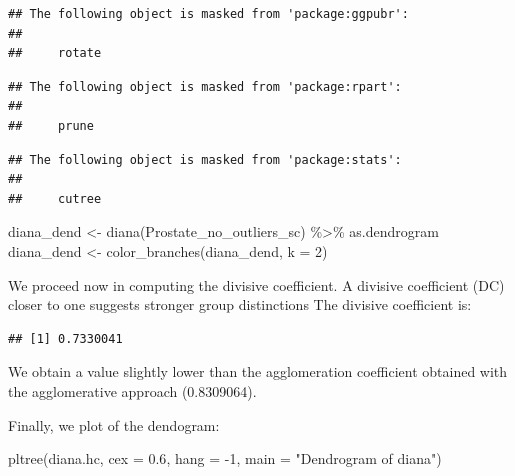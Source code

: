 \documentclass[
]{article}
\newenvironment{Shaded}{\begin{snugshade}}{\end{snugshade}}
\newcommand{\AttributeTok}[1]{\textcolor[rgb]{0.77,0.63,0.00}{#1}}
\newcommand{\DecValTok}[1]{\textcolor[rgb]{0.00,0.00,0.81}{#1}}
\newcommand{\FloatTok}[1]{\textcolor[rgb]{0.00,0.00,0.81}{#1}}
\newcommand{\FunctionTok}[1]{\textcolor[rgb]{0.00,0.00,0.00}{#1}}
\newcommand{\NormalTok}[1]{#1}
\newcommand{\OtherTok}[1]{\textcolor[rgb]{0.56,0.35,0.01}{#1}}
\newcommand{\SpecialCharTok}[1]{\textcolor[rgb]{0.00,0.00,0.00}{#1}}
\newcommand{\StringTok}[1]{\textcolor[rgb]{0.31,0.60,0.02}{#1}}
\begin{document}
\begin{verbatim}
## The following object is masked from 'package:ggpubr':
## 
##     rotate
\end{verbatim}

\begin{verbatim}
## The following object is masked from 'package:rpart':
## 
##     prune
\end{verbatim}

\begin{verbatim}
## The following object is masked from 'package:stats':
## 
##     cutree
\end{verbatim}

\begin{Shaded}
\begin{Highlighting}[]
\NormalTok{diana\_dend }\OtherTok{\textless{}{-}} \FunctionTok{diana}\NormalTok{(Prostate\_no\_outliers\_sc) }\SpecialCharTok{\%\textgreater{}\%}\NormalTok{ as.dendrogram}
\NormalTok{diana\_dend }\OtherTok{\textless{}{-}} \FunctionTok{color\_branches}\NormalTok{(diana\_dend, }\AttributeTok{k =} \DecValTok{2}\NormalTok{)}
\end{Highlighting}
\end{Shaded}

We proceed now in computing the divisive coefficient. A divisive
coefficient (DC) closer to one suggests stronger group distinctions The
divisive coefficient is:

\begin{Shaded}
\end{Shaded}

\begin{verbatim}
## [1] 0.7330041
\end{verbatim}

We obtain a value slightly lower than the agglomeration coefficient
obtained with the agglomerative approach (0.8309064).

Finally, we plot of the dendogram:

\begin{Shaded}
\begin{Highlighting}[]
\FunctionTok{pltree}\NormalTok{(diana.hc, }\AttributeTok{cex =} \FloatTok{0.6}\NormalTok{, }\AttributeTok{hang =} \SpecialCharTok{{-}}\DecValTok{1}\NormalTok{, }\AttributeTok{main =} \StringTok{"Dendrogram of diana"}\NormalTok{)}
\end{Highlighting}
\end{Shaded}
\end{document}
